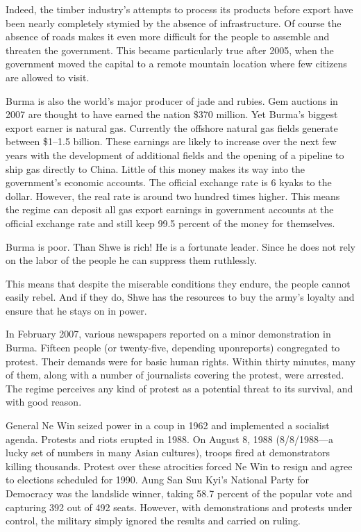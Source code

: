 \documentclass[10pt]{article}
\begin{document}
{\large Indeed, the timber industry's attempts to process its products before
export have been nearly completely stymied by the absence of infrastructure. Of
course the absence of roads makes it even more difficult for the people to
assemble and threaten the government. This became particularly true after 2005,
when the government moved the capital to a remote mountain location where few
citizens are allowed to visit.}

{\large Burma is also the world's major producer of jade and rubies. Gem
auctions in 2007 are thought to have earned the nation \$370 million. Yet Burma's
biggest export earner is natural gas. Currently the offshore natural gas fields
generate between \$1--1.5 billion. These earnings are likely to increase over the
next few years with the development of additional fields and the opening of a
pipeline to ship gas directly to China. Little of this money makes its way into
the government's economic accounts. The official exchange rate is 6 kyaks to the
dollar. However, the real rate is around two hundred times higher. This means the
regime can deposit all gas export earnings in government accounts at the official
exchange rate and still keep 99.5 percent of the money for themselves.}

{\large Burma is poor. Than Shwe is rich! He is a fortunate leader. Since he
does not rely on the labor of the people he can suppress them ruthlessly.}

{\large This means that despite the miserable conditions they endure, the people
cannot easily rebel. And if they do, Shwe has the resources to buy the army's
loyalty and ensure that he stays on in power.}

{\large In February 2007, various newspapers reported on a minor demonstration
in Burma. Fifteen people (or twenty-five, depending uponreports) congregated to
protest. Their demands were for basic human rights. Within thirty minutes, many
of them, along with a number of journalists covering the protest, were arrested.
The regime perceives any kind of protest as a potential threat to its survival,
and with good reason.}

{\large General Ne Win seized power in a coup in 1962 and implemented a
socialist agenda. Protests and riots erupted in 1988. On August 8, 1988
(8/8/1988---a lucky set of numbers in many Asian cultures), troops fired at
demonstrators killing thousands. Protest over these atrocities forced Ne Win to
resign and agree to elections scheduled for 1990. Aung San Suu Kyi's National
Party for Democracy was the landslide winner, taking 58.7 percent of the popular
vote and capturing 392 out of 492 seats. However, with demonstrations and
protests under control, the military simply ignored the results and carried on
ruling.}
\end{document}
